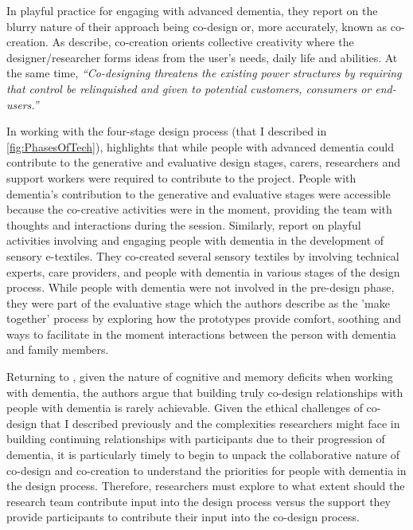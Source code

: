 In \cite{tsekleves2020engaging} playful practice for engaging with advanced dementia, they report on the blurry nature of their approach being co-design or, more accurately, known as co-creation. As \cite{sanders2008co} describe, co-creation orients collective creativity where the designer/researcher forms ideas from the user's needs, daily life and abilities. At the same time, \textit{``Co-designing threatens the existing power structures by requiring that control be relinquished and given to potential customers, consumers or end-users.''}

In working with the four-stage design process (that I described in \ref{fig:PhasesOfTech}), \cite{tsekleves2020engaging} highlights that while people with advanced dementia could contribute to the generative and evaluative design stages, carers, researchers and support workers were required to contribute to the project. People with dementia's contribution to the generative and evaluative stages were accessible because the co-creative activities were in the moment, providing the team with thoughts and interactions during the session. Similarly, \cite{treadaway_sensor_2016} report on playful activities involving and engaging people with dementia in the development of sensory e-textiles. They co-created several sensory textiles by involving technical experts, care providers, and people with dementia in various stages of the design process. While people with dementia were not involved in the pre-design phase, they were part of the evaluative stage which the authors describe as the 'make together' process by exploring how the prototypes provide comfort, soothing and ways to facilitate in the moment interactions between the person with dementia and family members.

Returning to \cite{tsekleves2020engaging}, given the nature of cognitive and memory deficits when working with dementia, the authors argue that building truly co-design relationships with people with dementia is rarely achievable. Given the ethical challenges of co-design that I described previously and the complexities researchers might face in building continuing relationships with participants due to their progression of dementia, it is particularly timely to begin to unpack the collaborative nature of co-design and co-creation to understand the priorities for people with dementia in the design process. Therefore, researchers must explore to what extent should the research team contribute input into the design process versus the support they provide participants to contribute their input into the co-design process.

